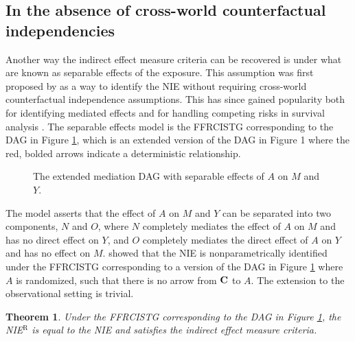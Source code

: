 \documentclass[12pt]{article}
\newtheorem{theorem}{Theorem}
\begin{document}
\subsection{In the absence of cross-world counterfactual independencies}
Another way the indirect effect measure criteria can be recovered is under what are known as separable effects of the exposure. This assumption was first proposed by \cite{robins2010alternative} as a way to identify the NIE without requiring cross-world counterfactual independence assumptions. This has since gained popularity both for identifying mediated effects \citep{didelez2019defining, robins2022interventionist} and for handling competing risks in survival analysis \citep{stensrud2020separable}. The separable effects model is the FFRCISTG corresponding to the DAG in Figure \ref{fig:DAG3}, which is an extended version of the DAG in Figure 1 where the red, bolded arrows indicate a deterministic relationship. 
\begin{figure}[h]
    \centering
    \caption{The extended mediation DAG with separable effects of $A$ on $M$ and $Y$.\label{fig:DAG3}}
\end{figure}
The model asserts that the effect of $A$ on $M$ and $Y$ can be separated into two components, $N$ and $O$, where $N$ completely mediates the effect of $A$ on $M$ and has no direct effect on $Y$, and $O$ completely mediates the direct effect of $A$ on $Y$ and has no effect on $M$. \cite{robins2010alternative} showed that the NIE is nonparametrically identified under the FFRCISTG corresponding to a version of the DAG in Figure \ref{fig:DAG3} where $A$ is randomized, such that there is no arrow from $\bf C$ to $A$. The extension to the observational setting is trivial.
\begin{theorem}
    \label{thm:separable-effects}
    Under the FFRCISTG corresponding to the DAG in Figure \ref{fig:DAG3}, the NIE$^{\text{R}}$ is equal to the NIE and satisfies the indirect effect measure criteria.
\end{theorem}
\end{document}
